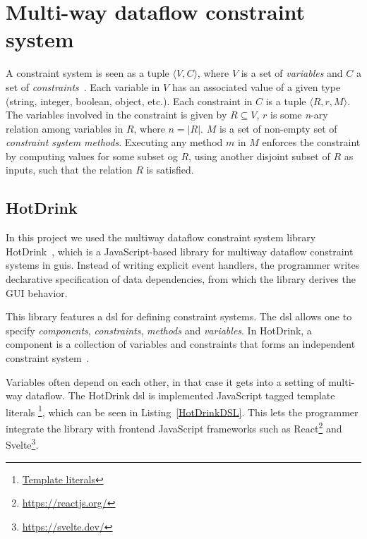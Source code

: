 \chapter{Multi-way dataflow constraint system}
\label{chap:constraint-systems}

A constraint system is seen as a tuple ${\langle V, C \rangle}$, where $V$ is a set of \textit{variables} and $C$ a set of \textit{constraints}~\cite{jarvi_algorithms_2009}. Each variable in $V$ has an associated value of a given type (string, integer, boolean, object, etc.). Each constraint in $C$ is a tuple ${\langle R, r, M \rangle}$. The variables involved in the constraint is given by ${R \subseteq V}$, $r$ is some \textit{n}-ary relation among variables in $R$, where ${n = \lvert R \rvert}$. $M$ is a set of non-empty set of \textit{constraint system methods}. Executing any method $m$ in $M$ enforces the constraint by computing values for some subset og $R$, using another disjoint subset of $R$ as inputs, such that the relation $R$ is satisfied.



\section{HotDrink}
\label{sec:hotdrink}

In this project we used the multiway dataflow constraint system library 
HotDrink~\cite{HotDrink}, which is a JavaScript-based library for multiway dataflow constraint systems in \gls{gui}s. Instead of writing explicit event handlers, the programmer writes declarative specification of data dependencies, from which the library derives the GUI behavior.

This library features a \gls{dsl} for defining constraint systems.
The \gls{dsl} allows one to specify \emph{components}, \emph{constraints}, \emph{methods} 
and \emph{variables}.
In HotDrink, a component is a collection of variables and constraints that forms an independent constraint system~\cite{svartveit2021multithreaded}. 

Variables often depend on each other,
in that case it gets into a setting of multi-way dataflow.
The HotDrink \gls{dsl} is implemented JavaScript tagged template literals
\footnote{\href{https://developer.mozilla.org/en-US/docs/Web/JavaScript/Reference/Template_literals}{Template literals}}, 
which can be seen in Listing~\ref{HotDrinkDSL}. This lets the programmer integrate the 
library with frontend JavaScript frameworks such as 
React\footnote{\url{https://reactjs.org/}} and Svelte\footnote{\url{https://svelte.dev/}}. 

